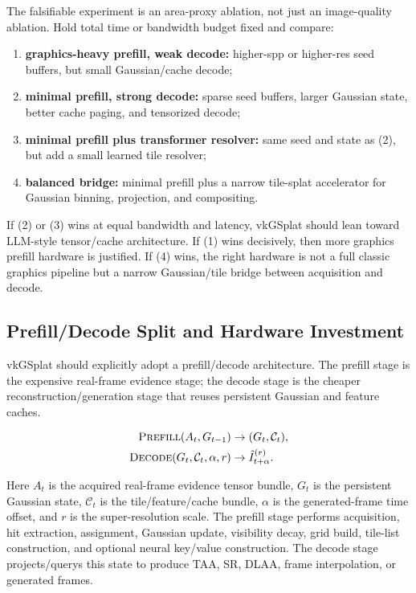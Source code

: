 \documentclass[11pt]{article}
\begin{document}
The falsifiable experiment is an area-proxy ablation, not just an image-quality
ablation. Hold total time or bandwidth budget fixed and compare:

\begin{enumerate}
  \item \textbf{graphics-heavy prefill, weak decode:} higher-spp or higher-res
        seed buffers, but small Gaussian/cache decode;
  \item \textbf{minimal prefill, strong decode:} sparse seed buffers, larger
        Gaussian state, better cache paging, and tensorized decode;
  \item \textbf{minimal prefill plus transformer resolver:} same seed and state
        as (2), but add a small learned tile resolver;
  \item \textbf{balanced bridge:} minimal prefill plus a narrow tile-splat
        accelerator for Gaussian binning, projection, and compositing.
\end{enumerate}

If (2) or (3) wins at equal bandwidth and latency, vkGSplat should lean toward
LLM-style tensor/cache architecture. If (1) wins decisively, then more graphics
prefill hardware is justified. If (4) wins, the right hardware is not a full
classic graphics pipeline but a narrow Gaussian/tile bridge between acquisition
and decode.

\subsection{Prefill/Decode Split and Hardware Investment}

vkGSplat should explicitly adopt a prefill/decode architecture. The prefill
stage is the expensive real-frame evidence stage; the decode stage is the
cheaper reconstruction/generation stage that reuses persistent Gaussian and
feature caches.

\[
\begin{aligned}
  \textsc{Prefill}(A_t,G_{t-1}) &\rightarrow (G_t,\mathcal{C}_t),\\
  \textsc{Decode}(G_t,\mathcal{C}_t,\alpha,r) &\rightarrow \hat I_{t+\alpha}^{(r)}.
\end{aligned}
\]

Here $A_t$ is the acquired real-frame evidence tensor bundle, $G_t$ is the
persistent Gaussian state, $\mathcal{C}_t$ is the tile/feature/cache bundle,
$\alpha$ is the generated-frame time offset, and $r$ is the super-resolution
scale. The prefill stage performs acquisition, hit extraction, assignment,
Gaussian update, visibility decay, grid build, tile-list construction, and
optional neural key/value construction. The decode stage projects/querys this
state to produce TAA, SR, DLAA, frame interpolation, or generated frames.
\end{document}
